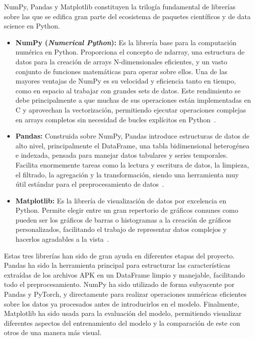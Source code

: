 
NumPy, Pandas y Matplotlib constituyen la trilogía fundamental de librerías sobre las que se edifica gran parte del ecosistema de paquetes científicos y de data science en Python.

\begin{itemize}
	\item \textbf{NumPy (\textit{Numerical Python}):} Es la librería base para la computación numérica en Python. Proporciona el concepto de ndarray, una estructura de datos para la creación de arrays N-dimensionales eficientes, y un vasto conjunto de funciones matemáticas para operar sobre ellos. Una de las mayores ventajas de NumPy es su velocidad y eficiencia tanto en tiempo, como en espacio al trabajar con grandes sets de datos. Este rendimiento se debe principalmente a que muchas de sus operaciones están implementadas en C y aprovechan la vectorización, permitiendo ejecutar operaciones complejas en arrays completos sin necesidad de bucles explícitos en Python~\cite{numpyRef}.
	
	\item \textbf{Pandas:} Construida sobre NumPy, Pandas introduce estructuras de datos de alto nivel, principalmente el DataFrame, una tabla bidimensional heterogénea e indexada, pensada para manejar datos tabulares y series temporales. Facilita enormemente tareas como la lectura y escritura de datos, la limpieza, el filtrado, la agregación y la transformación, siendo una herramienta muy útil estándar para el preprocesamiento de datos~\cite{pandasRef}.

	\item \textbf{Matplotlib:} Es la librería de visualización de datos por excelencia en Python. Permite elegir entre un gran repertorio de gráficos comunes como pueden ser los gráficos de barras o histogramas a la creación de gráficos personalizados, facilitando el trabajo de representar datos complejos y hacerlos agradables a la vista~\cite{matplotlibRef}.
	
\end{itemize}

Estas tres librerías han sido de gran ayuda en diferentes etapas del proyecto. Pandas ha sido la herramienta principal para estructurar las características extraídas de los archivos APK en un DataFrame limpio y manejable, facilitando todo el preprocesamiento. NumPy ha sido utilizado de forma subyacente por Pandas y PyTorch, y directamente para realizar operaciones numéricas eficientes sobre los datos ya procesados antes de introducirlos en el modelo. Finalmente, Matplotlib ha sido usada para la evaluación del modelo, permitiendo visualizar diferentes aspectos del entrenamiento del modelo y la comparación de este con otros de una manera más visual.

